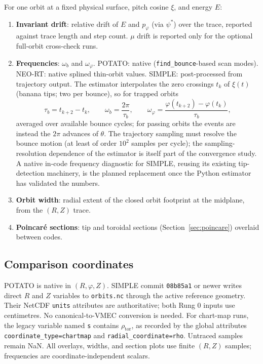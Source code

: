 \documentclass[11pt,a4paper]{article}
\newcommand{\code}[1]{\texttt{#1}}
\begin{document}
For one orbit at a fixed physical surface, pitch cosine $\xi$, and energy $E$:
\begin{enumerate}
\item \textbf{Invariant drift}: relative drift of $E$ and $p_\varphi$
  (via $\psi^*$) over the trace, reported against trace length and step count.
  $\mu$ drift is reported only for the optional full-orbit cross-check runs.
\item \textbf{Frequencies}: $\omega_b$ and $\omega_\varphi$.
  POTATO: native (\code{find\_bounce}-based scan modes).
  NEO-RT: native splined thin-orbit values.
  SIMPLE: post-processed from trajectory output. The estimator interpolates
  the zero crossings $t_k$ of $\xi(t)$ (banana tips; two per bounce), so
  for trapped orbits
  \begin{equation}
    \tau_b = t_{k+2} - t_k, \qquad
    \omega_b = \frac{2\pi}{\tau_b}, \qquad
    \omega_\varphi = \frac{\varphi(t_{k+2}) - \varphi(t_k)}{\tau_b},
  \end{equation}
  averaged over available bounce cycles; for passing orbits the events are
  instead the $2\pi$ advances of $\theta$. The trajectory sampling must
  resolve the bounce motion (at least of order $10^2$ samples per cycle);
  the sampling-resolution dependence of the estimator is itself part of the
  convergence study. A native in-code frequency diagnostic for SIMPLE,
  reusing its existing tip-detection machinery, is the planned replacement
  once the Python estimator has validated the numbers.
\item \textbf{Orbit width}: radial extent of the closed orbit footprint at
  the midplane, from the $(R,Z)$ trace.
\item \textbf{Poincar\'e sections}: tip and toroidal sections
  (Section~\ref{sec:poincare}) overlaid between codes.
\end{enumerate}

\subsection{Comparison coordinates}

POTATO is native in $(R,\varphi,Z)$. SIMPLE commit \code{08b85a1} or newer
writes direct $R$ and $Z$ variables to \code{orbits.nc} through the active
reference geometry. Their NetCDF \code{units} attributes are authoritative;
both Rung 0 inputs use centimetres. No canonical-to-VMEC conversion is needed.
For chart-map runs, the legacy variable named \code{s} contains
$\rho_{\mathrm{tor}}$, as recorded by the global attributes
\code{coordinate\_type=chartmap} and \code{radial\_coordinate=rho}. Untraced
samples remain NaN. All overlays, widths, and section plots use finite
$(R,Z)$ samples; frequencies are coordinate-independent scalars.
\end{document}
